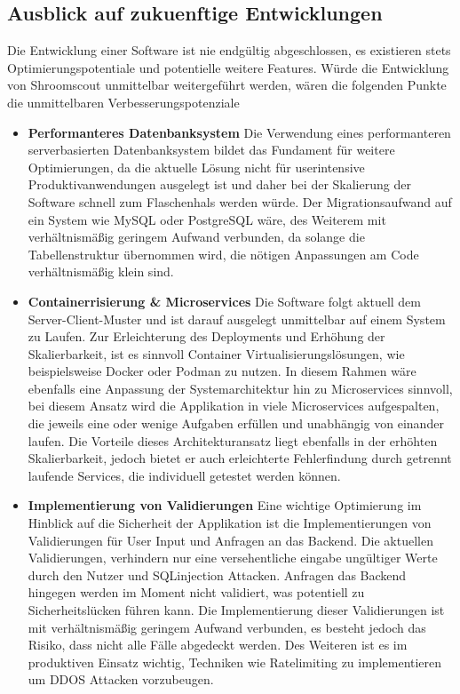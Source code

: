 \documentclass[../main.tex]{subfiles}
\begin{document}
\subsection{Ausblick auf zukuenftige Entwicklungen}
Die Entwicklung einer Software ist nie endgültig abgeschlossen, es existieren stets Optimierungspotentiale und potentielle weitere Features.
Würde die Entwicklung von Shroomscout unmittelbar weitergeführt werden, wären die folgenden Punkte die unmittelbaren Verbesserungspotenziale

\begin{itemize}

    \item \textbf{Performanteres Datenbanksystem}
        Die Verwendung eines performanteren serverbasierten Datenbanksystem bildet das Fundament für weitere Optimierungen, da die aktuelle Lösung nicht für userintensive
        Produktivanwendungen ausgelegt ist und daher bei der Skalierung der Software schnell zum Flaschenhals werden würde. Der Migrationsaufwand auf ein System wie MySQL oder PostgreSQL
        wäre, des Weiterem mit verhältnismäßig geringem Aufwand verbunden, da solange die Tabellenstruktur übernommen wird, die nötigen Anpassungen am Code verhältnismäßig klein sind. 

	\item \textbf{Containerrisierung \& Microservices}
	    Die Software folgt aktuell dem Server-Client-Muster und ist darauf ausgelegt unmittelbar auf einem System zu Laufen.
        Zur Erleichterung des Deployments und Erhöhung der Skalierbarkeit, ist es sinnvoll Container Virtualisierungslösungen, wie beispielsweise Docker oder Podman zu nutzen.
        In diesem Rahmen wäre ebenfalls eine Anpassung der Systemarchitektur hin zu Microservices sinnvoll, bei diesem Ansatz wird die Applikation in viele Microservices aufgespalten,
        die jeweils eine oder wenige Aufgaben erfüllen und unabhängig von einander laufen. Die Vorteile dieses Architekturansatz liegt ebenfalls in der erhöhten Skalierbarkeit, jedoch
        bietet er auch erleichterte Fehlerfindung durch getrennt laufende Services, die individuell getestet werden können.
        
    \item \textbf{Implementierung von Validierungen}
        Eine wichtige Optimierung im Hinblick auf die Sicherheit der Applikation ist die Implementierungen von Validierungen für User Input und Anfragen an das Backend.
        Die aktuellen Validierungen, verhindern nur eine versehentliche eingabe ungültiger Werte durch den Nutzer und SQLinjection Attacken. Anfragen das Backend hingegen werden
        im Moment nicht validiert, was potentiell zu Sicherheitslücken führen kann. Die Implementierung dieser Validierungen ist mit verhältnismäßig geringem Aufwand verbunden,
        es besteht jedoch das Risiko, dass nicht alle Fälle abgedeckt werden. Des Weiteren ist es im produktiven Einsatz wichtig, Techniken wie Ratelimiting zu implementieren um 
        DDOS Attacken vorzubeugen.
        

\end{itemize}
\end{document}
